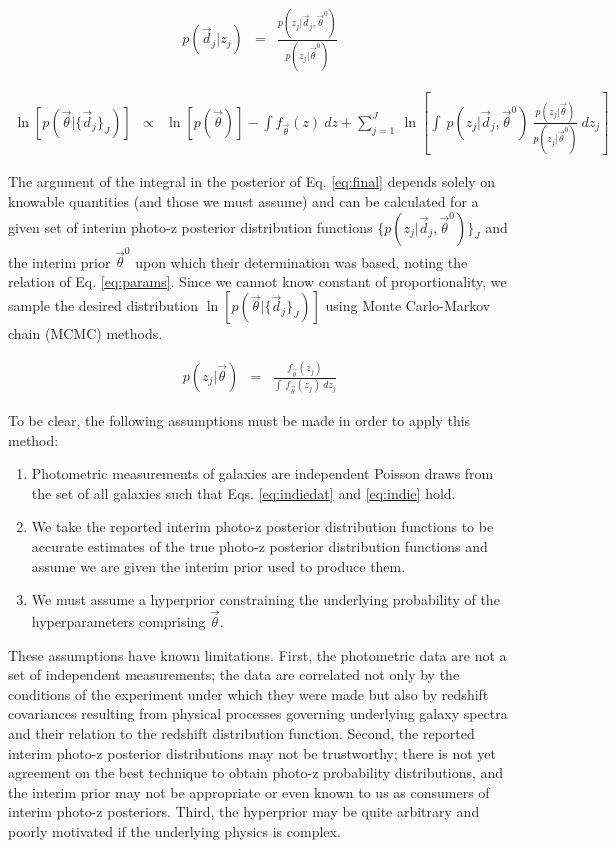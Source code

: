 \documentclass[preprint]{aastex}
\begin{document}
\begin{eqnarray}
\label{eq:cancel}
p(\vec{d}_{j}|z_{j}) &=& 
\frac{p(z_{j}|\vec{d}_{j},\vec{\theta}^{0})}{p(z_{j}|\vec{\theta}^{0})}
\end{eqnarray}

\begin{eqnarray}
\label{eq:final}
\ln[p(\vec{\theta}|\{\vec{d}_{j}\}_{J})] &\propto& \ln[p(\vec{\theta})]-\int 
f_{\vec{\theta}}(z)\ dz + \sum_{j=1}^{J}\ \ln\left[\int\ 
p(z_{j}|\vec{d}_{j},\vec{\theta}^{0})\ 
\frac{p(z_{j}|\vec{\theta})}{p(z_{j}|\vec{\theta}^{0})}\ dz_{j}\right]
\end{eqnarray}

The argument of the integral in the posterior of Eq. \ref{eq:final} depends 
solely on knowable quantities (and those we must assume) and can be calculated 
for a given set of interim photo-z posterior distribution functions 
$\{p(z_{j}|\vec{d}_{j},\vec{\theta}^{0})\}_{J}$ and the interim prior 
$\vec{\theta}^{0}$ upon which their determination was based, noting the 
relation of Eq. \ref{eq:params}.  Since we cannot know constant of 
proportionality, we sample the desired distribution 
$\ln[p(\vec{\theta}|\{\vec{d}_{j}\}_{J})]$ using Monte Carlo-Markov chain 
(MCMC) methods.  

\begin{eqnarray}
\label{eq:params}
p(z_{j}|\vec{\theta}) &=& \frac{f_{\vec{\theta}}(z_{j})}{\int\ 
f_{\vec{\theta}}(z_{j})\ dz_{j}}
\end{eqnarray}

To be clear, the following assumptions must be made in order to apply this 
method:

\begin{enumerate}
\item Photometric measurements of galaxies are independent Poisson draws from 
the set of all galaxies such that Eqs. \ref{eq:indiedat} and \ref{eq:indie} 
hold.
\item We take the reported interim photo-z posterior distribution functions to 
be accurate estimates of the true photo-z posterior distribution functions and 
assume we are given the interim prior used to produce them.
\item We must assume a hyperprior constraining the underlying probability of 
the hyperparameters comprising $\vec{\theta}$.
\end{enumerate}

These assumptions have known limitations.  First, the photometric data are not 
a set of independent measurements; the data are correlated not only by the 
conditions of the experiment under which they were made but also by redshift 
covariances resulting from physical processes governing underlying galaxy 
spectra and their relation to the redshift distribution function.  Second, the 
reported interim photo-z posterior distributions may not be trustworthy; there 
is not yet agreement on the best technique to obtain photo-z probability 
distributions, and the interim prior may not be appropriate or even known to us 
as consumers of interim photo-z posteriors.  Third, the hyperprior may be quite 
arbitrary and poorly motivated if the underlying physics is complex.
\end{document}
